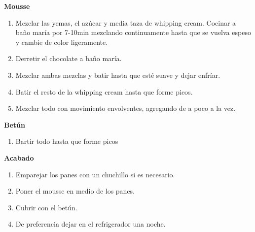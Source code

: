 \textbf{Mousse}
\begin{enumerate}
\item Mezclar las yemas, el azúcar y media taza de whipping cream. Cocinar a baño maría por 7-10min mezclando continuamente hasta que se vuelva espeso y cambie de color ligeramente.
\item Derretir el chocolate a baño maría.
\item Mezclar ambas mezclas y batir hasta que esté suave y dejar enfríar.
\item Batir el resto de la whipping cream hasta que forme picos.
\item Mezclar todo con movimiento envolventes, agregando de a poco a la vez.
\end{enumerate}

\textbf{Betún}
\begin{enumerate}
\item Bartir todo hasta que forme picos
\end{enumerate}

\textbf{Acabado}
\begin{enumerate}
\item Emparejar los panes con un chuchillo si es necesario.
\item Poner el mousse en medio de los panes.
\item Cubrir con el betún.
\item De preferencia dejar en el refrigerador una noche.
\end{enumerate}